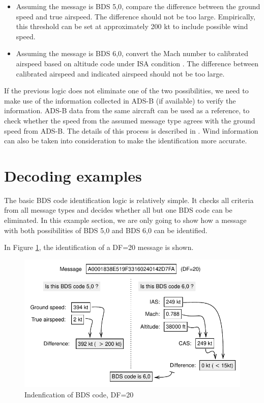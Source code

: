 \begin{itemize}
    \item Assuming the message is BDS 5,0, compare the difference between the ground speed and true airspeed. The difference should not be too large. Empirically, this threshold can be set at approximately 200 kt to include possible wind speed. 
    \item Assuming the message is BDS 6,0, convert the Mach number to calibrated airspeed based on altitude code under ISA condition \cite{young2017}. The difference between calibrated airspeed and indicated airspeed should not be too large.
\end{itemize}

If the previous logic does not eliminate one of the two possibilities, we need to make use of the information collected in ADS-B (if available) to verify the information. ADS-B data from the same aircraft can be used as a reference, to check whether the speed from the assumed message type agrees with the ground speed from ADS-B. The details of this process is described in \cite{sun2019pymodes}. Wind information can also be taken into consideration to make the identification more accurate.


\section{Decoding examples}

The basic BDS code identification logic is relatively simple. It checks all criteria from all message types and decides whether all but one BDS code can be eliminated. In this example section, we are only going to show how a message with both possibilities of BDS 5,0 and BDS 6,0 can be identified.


In Figure \ref{fig:bds_bds_infer_example_1}, the identification of a DF=20 message is shown. 

\begin{figure}[ht]
\centering
  \includegraphics[scale=0.85]{figures/mode_s/bds_infer_example_1.pdf}
\caption{Indenfication of BDS code, DF=20}
\label{fig:bds_bds_infer_example_1}
\end{figure}

